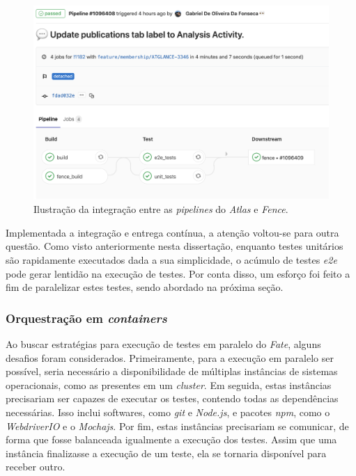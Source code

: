 \begin{figure}[H]
    \centering
    \includegraphics[width=13cm]{source/4-solucao/images/pipeline-update.png}
    \caption{Ilustração da integração entre as \emph{pipelines} do \emph{Atlas} e \emph{Fence}.}
    \label{fig:pipeline-update}
\end{figure}

Implementada a integração e entrega contínua, a atenção voltou-se para outra questão. Como visto anteriormente nesta dissertação, enquanto testes unitários são rapidamente executados dada a sua simplicidade, o acúmulo de testes \emph{e2e} pode gerar lentidão na execução de testes. Por conta disso, um esforço foi feito a fim de paralelizar estes testes, sendo abordado na próxima seção.

\hypertarget{orquestracao-em-containers}{%
\subsubsection{\texorpdfstring{Orquestração em \emph{containers}}{Orquestração em containers}}\label{orquestracao-em-containers}}

Ao buscar estratégias para execução de testes em paralelo do \emph{Fate}, alguns desafios foram considerados. Primeiramente, para a execução em paralelo ser possível, seria necessário a disponibilidade de múltiplas instâncias de sistemas operacionais, como as presentes em um \emph{cluster}. Em seguida, estas instâncias precisariam ser capazes de executar os testes, contendo todas as dependências necessárias. Isso inclui softwares, como \emph{git} e \emph{Node.js}, e pacotes \emph{npm}, como o \emph{WebdriverIO} e o \emph{Mochajs}. Por fim, estas instâncias precisariam se comunicar, de forma que fosse balanceada igualmente a execução dos testes. Assim que uma instância finalizasse a execução de um teste, ela se tornaria disponível para receber outro.

